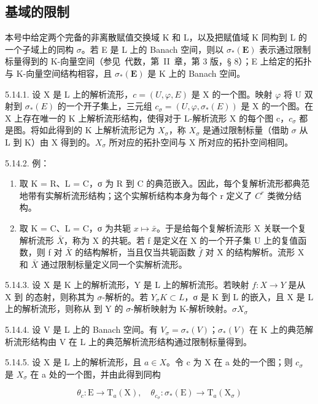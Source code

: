 \subsection{基域的限制}

本号中给定两个完备的非离散赋值交换域 K 和 L，以及把赋值域 K 同构到 L 的一个子域上的同构 \(\sigma\)。若 E 是 L 上的 Banach 空间，则以 \(\sigma_{*}(\mathbf{E})\) 表示通过限制标量得到的 K-向量空间（参见~代数，第~II~章，第 3 版，§ 8）；E 上给定的拓扑与 K-向量空间结构相容，且 \(\sigma_{*}(\mathbf{E})\) 是 K 上的 Banach 空间。

5.14.1. 设 X 是 L 上的解析流形，\(c = (U, \varphi, E)\) 是 X 的一个图。映射 \(\varphi\) 将 U 双射到 \(\sigma_{*}(E)\) 的一个开子集上，三元组 \(c_{\sigma} = (U, \varphi, \sigma_{*}(E))\) 是 X 的一个图。在 X 上存在唯一的 K 上解析流形结构，使得对于 L-解析流形 X 的每个图 c，\(c_{\sigma}\) 都是图。将如此得到的 K 上解析流形记为 \(X_{\sigma}\)，称 \(X_{\sigma}\) 是通过限制标量（借助 \(\sigma\) 从 L 到 K）由 X 得到的。\(X_{\sigma}\) 所对应的拓扑空间与 X 所对应的拓扑空间相同。

5.14.2. 例：

\begin{enumerate}
\def\labelenumi{(\alph{enumi})}
\item
  取 K = R、L = C，σ 为 R 到 C 的典范嵌入。因此，每个复解析流形都典范地带有实解析流形结构；这个实解析结构本身为每个 r 定义了 \(C^{r}\) 类微分结构。
\item
  取 K = C、L = C，σ 为共轭 \(x \mapsto \bar{x}\)。于是给每个复解析流形 X 关联一个复解析流形 \(\bar{X}\)，称为 X 的共轭。若 f 是定义在 X 的一个开子集 U 上的复值函数，则 f 对 \(\bar{X}\) 的结构解析，当且仅当共轭函数 \(\bar{f}\) 对 X 的结构解析。流形 X 和 \(\bar{X}\) 通过限制标量定义同一个实解析流形。
\end{enumerate}

5.14.3. 设 X 是 K 上的解析流形，Y 是 L 上的解析流形。若映射 \(f:X\to Y\) 是从 X 到  的态射，则称其为 \(\sigma\)-解析的。若 \(Y_{\sigma}\)\(K\subset L\)，σ 是 K 到 L 的嵌入，且 X 是 L 上的解析流形，则称从  到 Y 的 \(\sigma\)-解析映射为 K-解析映射。\(\sigma\)\(X_{\sigma}\)

5.14.4. 设 V 是 L 上的 Banach 空间。有 \(V_{\sigma} = \sigma_{*}(V)\)；\(\sigma_{*}(V)\) 在 K 上的典范解析流形结构由 V 在 L 上的典范解析流形结构通过限制标量得到。

5.14.5. 设 X 是 L 上的解析流形，且 \(a \in X\)。令 c 为 X 在 a 处的一个图；则 \(c_{\sigma}\) 是 \(X_{\sigma}\) 在 a 处的一个图，并由此得到同构

\[
\theta_ {c} \colon \mathrm{E} \rightarrow \mathrm{T} _ {a} (\mathrm{X}), \quad \theta_ {c _ {\sigma}} \colon \sigma_ {*} (\mathrm{E}) \rightarrow \mathrm{T} _ {a} (\mathrm{X} _ {\sigma})
\]

